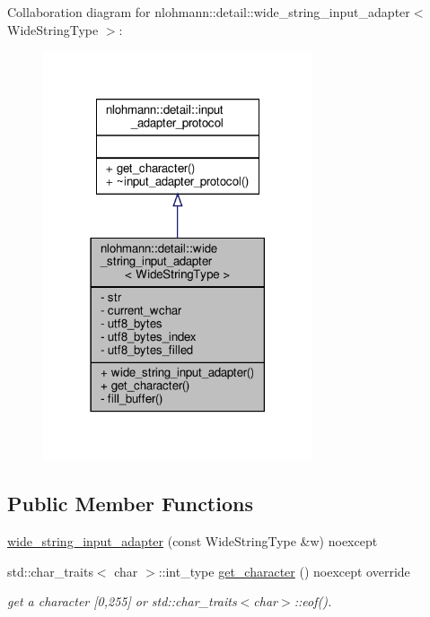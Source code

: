Collaboration diagram for nlohmann\+:\+:detail\+:\+:wide\+\_\+string\+\_\+input\+\_\+adapter$<$ Wide\+String\+Type $>$\+:\nopagebreak
\begin{figure}[H]
\begin{center}
\leavevmode
\includegraphics[width=225pt]{classnlohmann_1_1detail_1_1wide__string__input__adapter__coll__graph}
\end{center}
\end{figure}
\subsection*{Public Member Functions}
\begin{DoxyCompactItemize}
\item 
\hyperlink{classnlohmann_1_1detail_1_1wide__string__input__adapter_a85c8bddae20bc00d64dd7a2c87109357}{wide\+\_\+string\+\_\+input\+\_\+adapter} (const Wide\+String\+Type \&w) noexcept
\item 
std\+::char\+\_\+traits$<$ char $>$\+::int\+\_\+type \hyperlink{classnlohmann_1_1detail_1_1wide__string__input__adapter_abb62b34cf77e557ce5321b7f2490c3b0}{get\+\_\+character} () noexcept override
\begin{DoxyCompactList}\small\item\em get a character \mbox{[}0,255\mbox{]} or std\+::char\+\_\+traits$<$char$>$\+::eof(). \end{DoxyCompactList}\end{DoxyCompactItemize}
